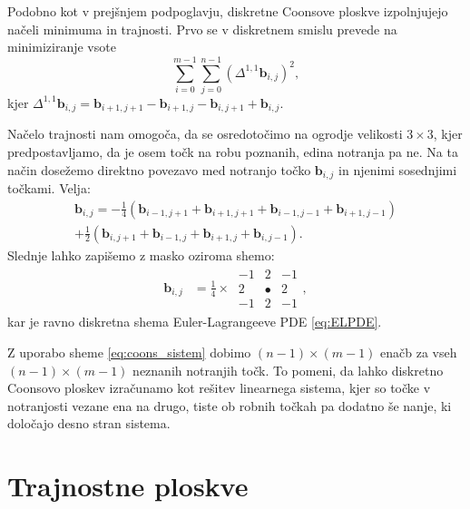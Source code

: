 \documentclass[twocolumn, 10pt]{article}    %
\begin{document}
Podobno kot v prejšnjem podpoglavju, diskretne Coonsove ploskve izpolnjujejo načeli minimuma in trajnosti.
Prvo se v diskretnem smislu prevede na minimiziranje vsote 
\begin{equation}
    \sum_{i=0}^{m-1} \sum_{j=0}^{n-1} (\Delta^{1,1} \mathbf{b}_{i,j})^2,
\end{equation}
kjer $\Delta^{1,1} \mathbf{b}_{i,j} = \mathbf{b}_{i+1,j+1} - \mathbf{b}_{i+1,j} - \mathbf{b}_{i,j+1} + \mathbf{b}_{i,j}.$

Načelo trajnosti nam omogoča, da se osredotočimo na ogrodje velikosti $3 \times 3$, kjer predpostavljamo, da je osem točk na robu poznanih, edina notranja pa ne.
Na ta način dosežemo direktno povezavo med notranjo točko $\mathbf{b}_{i,j}$ in njenimi sosednjimi točkami.
Velja:
\begin{multline}
    \mathbf{b}_{i,j} = -\frac{1}{4} \left( \mathbf{b}_{i-1,j+1} + \mathbf{b}_{i+1,j+1} + \mathbf{b}_{i-1,j-1} + \mathbf{b}_{i+1,j-1} \right) \\
     + \frac{1}{2} \left( \mathbf{b}_{i,j+1} + \mathbf{b}_{i-1,j} + \mathbf{b}_{i+1,j} + \mathbf{b}_{i,j-1} \right).
\end{multline}
Slednje lahko zapišemo z masko oziroma shemo:
\begin{align}
    \mathbf{b}_{i,j} &= \frac{1}{4} \times \ 
    \begin{matrix}
        -1 & 2 & -1 \\
        2 &  \bullet &  2 \\
        -1 & 2 & -1
    \end{matrix},
    \label{eq:coons_sistem}
\end{align}
kar je ravno diskretna shema Euler-Lagrangeeve PDE \ref{eq:ELPDE}.

Z uporabo sheme \ref{eq:coons_sistem} dobimo $(n-1) \times (m-1)$ enačb za vseh $(n-1) \times (m-1)$ neznanih notranjih točk.
To pomeni, da lahko diskretno Coonsovo ploskev izračunamo kot rešitev linearnega sistema, kjer so točke v notranjosti vezane ena na drugo, tiste ob robnih točkah pa dodatno še nanje, ki določajo desno stran sistema.  

\section{Trajnostne ploskve}
\end{document}

